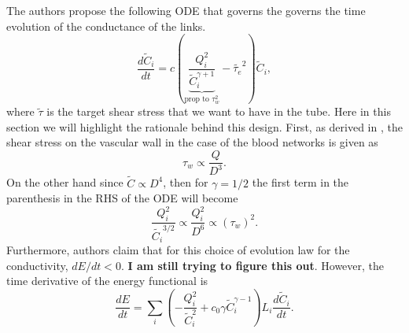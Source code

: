 \documentclass[10pt,a4paper,twocolumn]{article}
\begin{document}
	The authors propose the following ODE that governs the governs the time evolution of the conductance of the links. 
	\[ \frac{d\tilde{C}_i}{dt} = c\left(\underbrace{\frac{Q_i^2}{\tilde{C}_i^{\gamma+1}}}_{\text{prop to }\tau_w^2} - \tilde{\tau_e}^2\right) \tilde{C}_i, \]
	where $ \tilde{\tau} $ is the target shear stress that we want to have in the tube. Here in this section we will highlight the rationale behind this design. First, as derived in \cite{Secomb2012}, the shear stress on the vascular wall in the case of the blood networks is given as
	\[ \tau_w \propto \frac{Q}{D^3}. \]
	On the other hand since $ \tilde{C} \propto D^4 $, then for $ \gamma = 1/2 $ the first term in the parenthesis in the RHS of the ODE will become
	\[ \frac{Q_i^2}{\tilde{C_i}^{3/2}} \propto \frac{Q_i^2}{D^6} \propto (\tau_w)^2.  \]
	Furthermore, authors claim that for this choice of evolution law for the conductivity, $ dE/dt < 0 $. \textbf{I am still trying to figure this out}. However, the time derivative of the energy functional is
	\[ \frac{dE}{dt} = \sum_i\left(-\frac{Q_i^2}{\tilde{C}^2_i} + c_0\gamma \tilde{C}_i^{\gamma-1}\right) L_i \frac{d\tilde{C}_i}{dt}. \]
	
	
\end{document}
